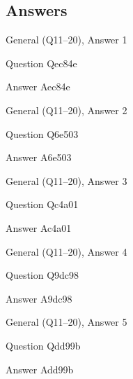 \documentclass[11pt]{beamer}
\begin{document}
\subsection{Answers}

\begin{frame}[t]{General (Q11--20), Answer 1}
\vspace{2em}
\begin{block}{Question}
Qec84e
\end{block}
\pause{}
\begin{block}{Answer}
Aec84e
\end{block}
\end{frame}
    

\begin{frame}[t]{General (Q11--20), Answer 2}
\vspace{2em}
\begin{block}{Question}
Q6e503
\end{block}
\pause{}
\begin{block}{Answer}
A6e503
\end{block}
\end{frame}
    

\begin{frame}[t]{General (Q11--20), Answer 3}
\vspace{2em}
\begin{block}{Question}
Qc4a01
\end{block}
\pause{}
\begin{block}{Answer}
Ac4a01
\end{block}
\end{frame}
    

\begin{frame}[t]{General (Q11--20), Answer 4}
\vspace{2em}
\begin{block}{Question}
Q9dc98
\end{block}
\pause{}
\begin{block}{Answer}
A9dc98
\end{block}
\end{frame}
    

\begin{frame}[t]{General (Q11--20), Answer 5}
\vspace{2em}
\begin{block}{Question}
Qdd99b
\end{block}
\pause{}
\begin{block}{Answer}
Add99b
\end{block}
\end{frame}
    
\end{document}
